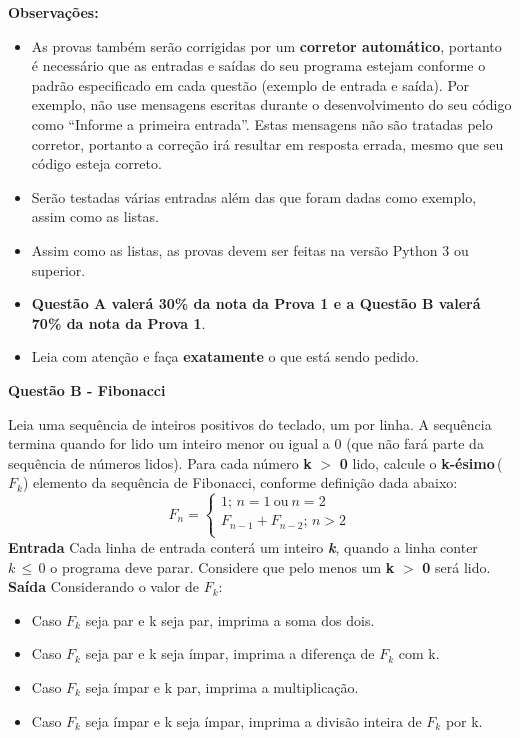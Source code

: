 \documentclass[a4paper, 12pt]{article}
\begin{document}
\textbf{{\large Observações:}}
\begin{itemize}
	\item As provas também serão corrigidas por um \textbf{corretor automático}, portanto é necessário que as entradas e saídas do seu programa estejam conforme o padrão especificado em cada questão (exemplo de entrada e saída). Por exemplo, não use mensagens escritas durante o desenvolvimento do seu código como “Informe a primeira entrada”. Estas mensagens não são tratadas pelo corretor, portanto a correção irá resultar em resposta errada, mesmo que seu código esteja correto.
	\item Serão testadas várias entradas além das que foram dadas como exemplo, assim como as listas.
	\item Assim como as listas, as provas devem ser feitas na versão Python 3 ou superior.
	\item \textbf{Questão A valerá 30\% da nota da Prova 1 e a Questão B valerá 70\% da nota da Prova 1}.
	\item Leia com atenção e faça \textbf{exatamente} o que está sendo pedido.
\end{itemize}
\newpage %
\begin{center}
\textbf{{\Large Questão B - Fibonacci}}
\end{center}
\vspace{5pt}
Leia uma sequência de inteiros positivos do teclado, um por linha. A sequência termina quando for lido um inteiro menor ou igual a 0 (que não fará parte da sequência de números lidos). Para cada número 
\textbf{k} $>$ \textbf{0} lido, calcule o \textbf{k-ésimo}\,($F_k$) elemento da sequência de Fibonacci, conforme definição dada abaixo:
$$F_n =
		\begin{cases}
			1;\, n = 1\ \textrm{ou}\ n = 2 \\
			F_{n-1} + F_{n-2};\, n > 2 \\
		\end{cases}
$$
\newline \newline
\textbf{{\large Entrada}} \newline
Cada linha de entrada conterá um inteiro \textbf{\textit{k}}, quando a linha conter 
$k\, \leq \, 0$ o programa deve parar. Considere que pelo menos um \textbf{k} $>$ \textbf{0} será lido.
\newline \newline
\textbf{{\large Saída}} \newline
Considerando o valor de $F_k$:
\begin{itemize}
\item Caso $F_k$ seja par e k seja par, imprima a soma dos dois.
\item Caso $F_k$ seja par e k seja ímpar, imprima a diferença de $F_k$ com k.
\item Caso $F_k$ seja ímpar e k par, imprima a multiplicação.
\item Caso $F_k$ seja ímpar e k seja ímpar, imprima a divisão inteira de $F_k$ por k.
\end{itemize}
\end{document}
